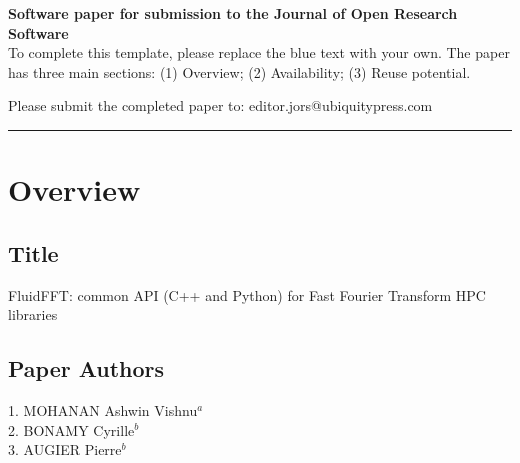 

{\bf Software paper for submission to the Journal of Open Research Software} \\

To complete this template, please replace the blue text with your own. The
paper has three main sections: (1) Overview; (2) Availability; (3) Reuse
potential.

Please submit the completed paper to: editor.jors@ubiquitypress.com

\rule{\textwidth}{1pt}

\section{Overview}

\vspace{0.5cm}

\subsection{Title}


FluidFFT: common API (C++ and Python) for Fast Fourier Transform HPC libraries

\subsection{Paper Authors}


1. MOHANAN Ashwin Vishnu$^a$\\
2. BONAMY Cyrille$^b$\\
3. AUGIER Pierre$^b$\\

\smallskip


